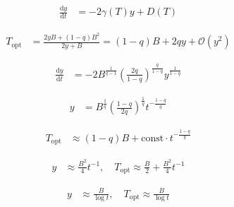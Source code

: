 \documentclass{article}
\begin{document}
\begin{align*}
\frac{\mathrm{d} y}{\mathrm{d} t} &= -2 \gamma(T) y + D(T)
\tag{9.106}
\end{align*}

\begin{align*}
T_{\mathrm{opt}} &= \frac{2 y B + (1-q) B^2}{2 y + B} = (1-q)B + 2q y + \mathcal{O}(y^2)
\tag{9.107}
\end{align*}

\begin{align*}
\frac{\mathrm{d} y}{\mathrm{d} t} &= -2 B^{\frac{1}{q-1}} \left(\frac{2q}{1-q}\right)^{\frac{q}{1-q}} y^{\frac{1}{1-q}}
\tag{9.108}
\end{align*}

\begin{align*}
y &= B^{\frac{1}{q}} \left(\frac{1-q}{2q}\right)^{\frac{1}{q}} t^{-\frac{1-q}{q}}
\tag{9.109}
\end{align*}

\begin{align*}
T_{\mathrm{opt}} &\approx (1-q) B + \mathrm{const} \cdot t^{-\frac{1-q}{q}}
\tag{9.110}
\end{align*}

\begin{align*}
y &\approx \frac{B^2}{4} t^{-1}, \quad T_{\mathrm{opt}} \approx \frac{B}{2} + \frac{B^2}{4} t^{-1}
\tag{9.111}
\end{align*}

\begin{align*}
y &\approx \frac{B}{\log t}, \quad T_{\mathrm{opt}} \approx \frac{B}{\log t}
\tag{9.112}
\end{align*}
\end{document}
